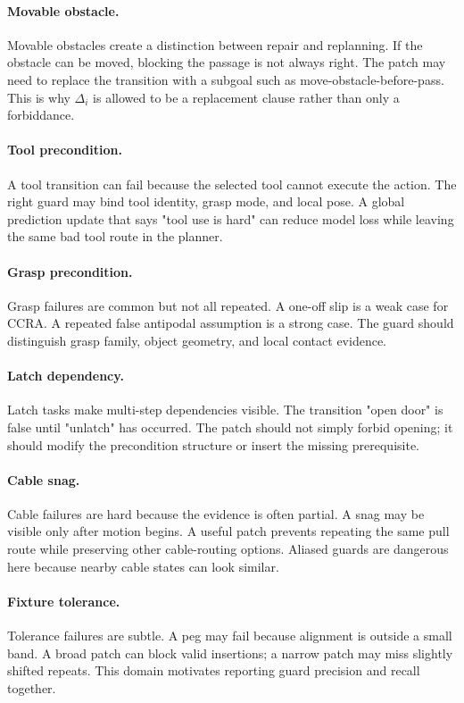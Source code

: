 \documentclass{article}
\newcommand{\ccra}{\textsc{CCRA}}
\newcommand{\patch}{\Delta}
\begin{document}
\paragraph{Movable obstacle.}
Movable obstacles create a distinction between repair and replanning. If the
obstacle can be moved, blocking the passage is not always right. The patch may
need to replace the transition with a subgoal such as move-obstacle-before-pass.
This is why $\patch_i$ is allowed to be a replacement clause rather than only a
forbiddance.

\paragraph{Tool precondition.}
A tool transition can fail because the selected tool cannot execute the action.
The right guard may bind tool identity, grasp mode, and local pose. A global
prediction update that says "tool use is hard" can reduce model loss while
leaving the same bad tool route in the planner.

\paragraph{Grasp precondition.}
Grasp failures are common but not all repeated. A one-off slip is a weak case
for \ccra{}. A repeated false antipodal assumption is a strong case. The guard
should distinguish grasp family, object geometry, and local contact evidence.

\paragraph{Latch dependency.}
Latch tasks make multi-step dependencies visible. The transition "open door" is
false until "unlatch" has occurred. The patch should not simply forbid opening;
it should modify the precondition structure or insert the missing prerequisite.

\paragraph{Cable snag.}
Cable failures are hard because the evidence is often partial. A snag may be
visible only after motion begins. A useful patch prevents repeating the same
pull route while preserving other cable-routing options. Aliased guards are
dangerous here because nearby cable states can look similar.

\paragraph{Fixture tolerance.}
Tolerance failures are subtle. A peg may fail because alignment is outside a
small band. A broad patch can block valid insertions; a narrow patch may miss
slightly shifted repeats. This domain motivates reporting guard precision and
recall together.
\end{document}
